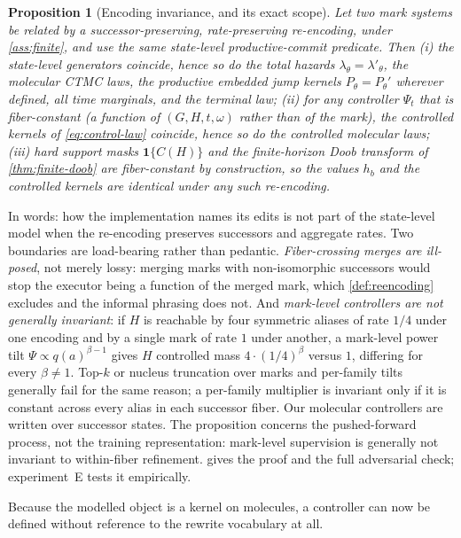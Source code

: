 \documentclass{article}
\newcommand{\one}{\mathbf{1}}
\newcommand{\Pmol}{P_{\theta}}
\newtheorem{proposition}[theorem]{Proposition}
\theoremstyle{definition}
\theoremstyle{remark}
\begin{document}
\begin{proposition}[Encoding invariance, and its exact scope]\label{prop:encoding}
Let two mark systems be related by a successor-preserving, rate-preserving re-encoding, under \cref{ass:finite}, and use the same state-level productive-commit predicate. Then \textup{(i)} the state-level generators coincide, hence so do the total hazards $\lambda_\theta=\lambda'_\theta$, the molecular CTMC laws, the productive embedded jump kernels $\Pmol=\Pmol'$ wherever defined, all time marginals, and the terminal law; \textup{(ii)} for any controller $\Psi_t$ that is \emph{fiber-constant} (a function of $(G,H,t,\omega)$ rather than of the mark), the controlled kernels of \eqref{eq:control-law} coincide, hence so do the controlled molecular laws; \textup{(iii)} hard support masks $\one\{C(H)\}$ and the finite-horizon Doob transform of \cref{thm:finite-doob} are fiber-constant by construction, so the values $h_b$ and the controlled kernels are identical under any such re-encoding.
\end{proposition}

In words: how the implementation names its edits is not part of the state-level model when the re-encoding preserves successors and aggregate rates. Two boundaries are load-bearing rather than pedantic. \emph{Fiber-crossing merges are ill-posed}, not merely lossy: merging marks with non-isomorphic successors would stop the executor being a function of the merged mark, which \cref{def:reencoding} excludes and the informal phrasing does not. And \emph{mark-level controllers are not generally invariant}: if $H$ is reachable by four symmetric aliases of rate $1/4$ under one encoding and by a single mark of rate $1$ under another, a mark-level power tilt $\Psi\propto q(a)^{\beta-1}$ gives $H$ controlled mass $4\cdot(1/4)^{\beta}$ versus $1$, differing for every $\beta\neq1$. Top-$k$ or nucleus truncation over marks and per-family tilts generally fail for the same reason; a per-family multiplier is invariant only if it is constant across every alias in each successor fiber. Our molecular controllers are written over successor states. The proposition concerns the pushed-forward process, not the training representation: mark-level supervision is generally not invariant to within-fiber refinement.  gives the proof and the full adversarial check; experiment~E tests it empirically.

Because the modelled object is a kernel on molecules, a controller can now be defined without reference to the rewrite vocabulary at all.
\end{document}
